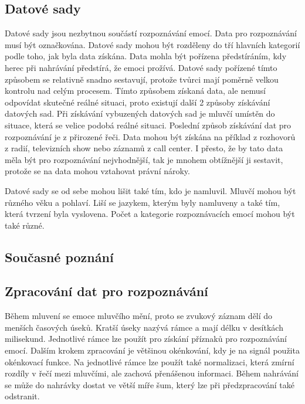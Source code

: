 \documentclass[FM,BP]{tulthesis}
\begin{document}
\subsection{Datové sady}
Datové sady jsou nezbytnou součástí rozpoznávání emocí. Data pro rozpoznávání musí být označkována. Datové sady mohou být rozděleny do tří hlavních kategorií podle toho, jak byla data získána. Data mohla být pořízena předstíráním, kdy herec při nahrávání předstírá, že emoci prožívá. Datové sady pořízené tímto způsobem se relativně snadno sestavují, protože tvůrci mají poměrně velkou kontrolu nad celým procesem. Tímto způsobem získaná data, ale nemusí odpovídat skutečné reálné situaci, proto existují další 2 způsoby získávání datových sad. Při získávání vybuzených datových sad je mluvčí umístěn do situace, která se velice podobá reálné situaci. Poslední způsob získávání dat pro rozpoznávání je z přirozené řeči. Data mohou být získána na příklad z rozhovorů z radií, televizních show nebo záznamů z call center. I přesto, že by tato data měla být pro rozpoznávání nejvhodnější, tak je mnohem obtížnější ji sestavit, protože se na data mohou vztahovat právní nároky.\cite{DBLP:journals/speech/AkcayO20}

Datové sady se od sebe mohou lišit také tím, kdo je namluvil. Mluvčí mohou být různého věku a pohlaví. Liší se jazykem, kterým byly namluveny a také tím, která tvrzení byla vyslovena. Počet a kategorie rozpoznávacích emocí mohou být také různé.\cite{DBLP:journals/speech/AkcayO20}

\subsection{Současné poznání}

\subsection{Zpracování dat pro rozpoznávání}
Během mluvení se emoce mluvčího mění, proto se zvukový záznam dělí do menších časových úseků. Kratší úseky nazývá rámce a mají délku v desítkách milisekund. Jednotlivé rámce lze použít pro získání příznaků pro rozpoznávání emocí. Dalším krokem zpracování je většinou okénkování, kdy je na signál použita okénkovací funkce. Na jednotlivé rámce lze použít také normalizaci, která zmírní rozdíly v řečí mezi mluvčími, ale zachová přenášenou informaci. Během nahrávání se může do nahrávky dostat ve větší míře šum, který lze při předzpracování také odstranit.\cite{DBLP:journals/speech/AkcayO20}
\end{document}
